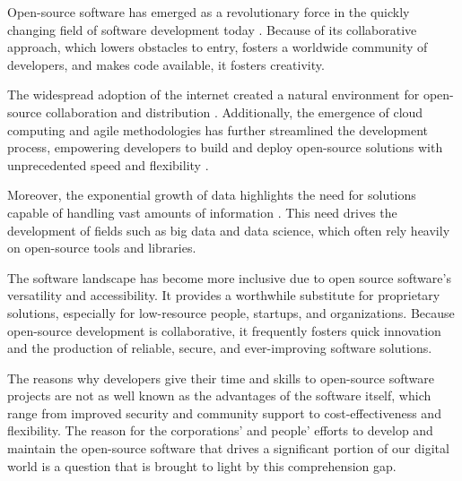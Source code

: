 

Open-source software has emerged as a revolutionary force in the quickly changing field of software development today \cite{fitzgerald2006transformation}. Because of its collaborative approach, which lowers obstacles to entry, fosters a worldwide community of developers, and makes code available, it fosters creativity.

The widespread adoption of the internet created a natural environment for open-source collaboration and distribution \cite{schweik2012internet}. Additionally, the emergence of cloud computing and agile methodologies has further streamlined the development process, empowering developers to build and deploy open-source solutions with unprecedented speed and flexibility \cite{raj2013envisioning}.

Moreover, the exponential growth of data highlights the need for solutions capable of handling vast amounts of information \cite{berman2013principles}. This need drives the development of fields such as big data and data science, which often rely heavily on open-source tools and libraries.

The software landscape has become more inclusive due to open source software's versatility and accessibility. It provides a worthwhile substitute for proprietary solutions, especially for low-resource people, startups, and organizations. Because open-source development is collaborative, it frequently fosters quick innovation and the production of reliable, secure, and ever-improving software solutions.

The reasons why developers give their time and skills to open-source software projects are not as well known as the advantages of the software itself, which range from improved security and community support to cost-effectiveness and flexibility. The reason for the corporations' and people' efforts to develop and maintain the open-source software that drives a significant portion of our digital world is a question that is brought to light by this comprehension gap.

